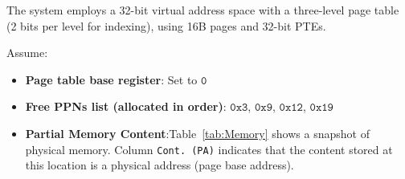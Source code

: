 

The system employs a 32-bit virtual address space with a three-level page table (2 bits per level for indexing), using 16B pages and 32-bit PTEs.

Assume:
\begin{itemize}[leftmargin=*]
    \item \textbf{Page table base register}: Set to  $\mathtt{0}$
    \item \textbf{Free PPNs list (allocated in order)}:  $\mathtt{0x3}$,  $\mathtt{0x9}$,  $\mathtt{0x12}$,  $\mathtt{0x19}$
    \item  \textbf{Partial Memory Content}:Table~\ref{tab:Memory} shows a snapshot of physical memory. Column \texttt{Cont. (PA)} indicates that the content stored at this location is a physical address (page base address).
\end{itemize}


